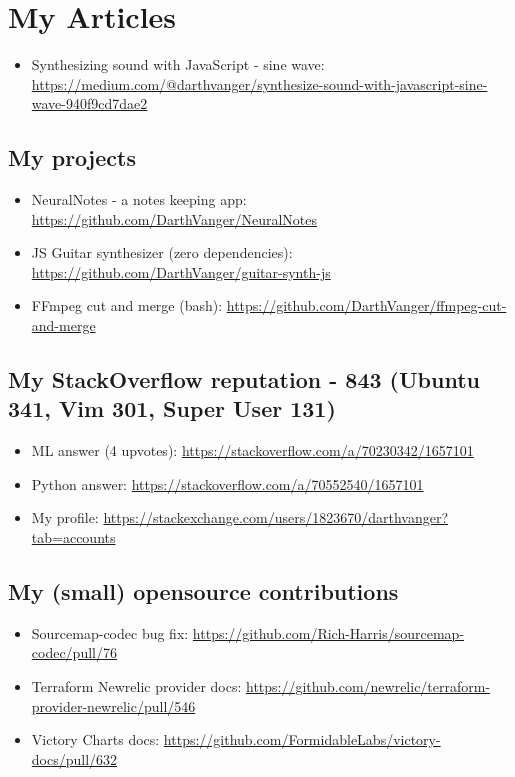 \documentclass[a4paper, 14pt]{article}
\begin{document}
\section{My Articles}
  \begin{itemize}
    \item Synthesizing sound with JavaScript - sine wave: \url{https://medium.com/@darthvanger/synthesize-sound-with-javascript-sine-wave-940f9cd7dae2}
  \end{itemize}

  \subsection{My projects}
    \begin{itemize}
      \item NeuralNotes - a notes keeping app: \url{https://github.com/DarthVanger/NeuralNotes} \\
      \item JS Guitar synthesizer (zero dependencies): \url{https://github.com/DarthVanger/guitar-synth-js} \\
      \item FFmpeg cut and merge (bash): \url{https://github.com/DarthVanger/ffmpeg-cut-and-merge}
    \end{itemize}

  \subsection{My StackOverflow reputation - 843 (Ubuntu 341, Vim 301, Super User 131)}
    \begin{itemize}
      \item ML answer (4 upvotes): \url{https://stackoverflow.com/a/70230342/1657101} \\
      \item Python answer: \url{https://stackoverflow.com/a/70552540/1657101}
      \item My profile: \url{https://stackexchange.com/users/1823670/darthvanger?tab=accounts} \\
    \end{itemize}

  \subsection{My (small) opensource contributions}
    \begin{itemize}
      \item Sourcemap-codec bug fix: \url{https://github.com/Rich-Harris/sourcemap-codec/pull/76} \\
      \item Terraform Newrelic provider docs: \url{https://github.com/newrelic/terraform-provider-newrelic/pull/546} \\
      \item Victory Charts docs: \url{https://github.com/FormidableLabs/victory-docs/pull/632}
    \end{itemize}
\end{document}
